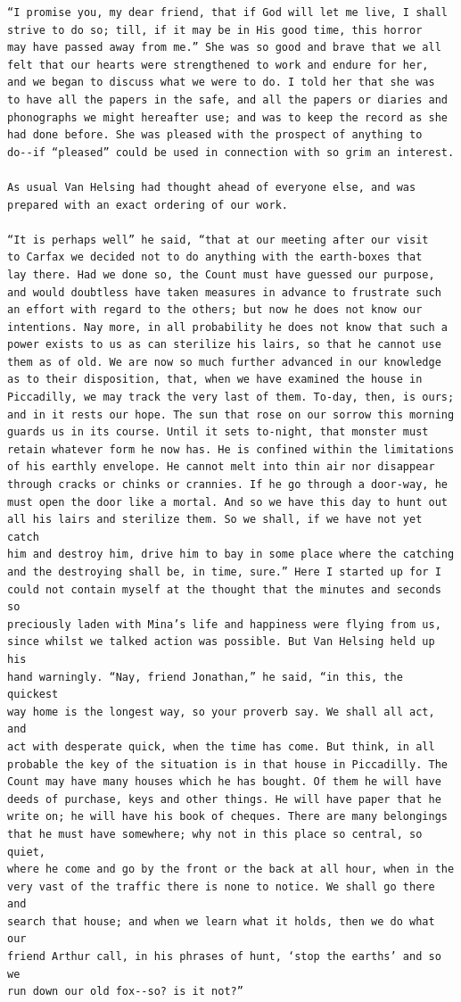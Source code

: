 \documentclass{article}
\begin{document}
\begin{verbatim}
“I promise you, my dear friend, that if God will let me live, I shall
strive to do so; till, if it may be in His good time, this horror
may have passed away from me.” She was so good and brave that we all
felt that our hearts were strengthened to work and endure for her,
and we began to discuss what we were to do. I told her that she was
to have all the papers in the safe, and all the papers or diaries and
phonographs we might hereafter use; and was to keep the record as she
had done before. She was pleased with the prospect of anything to
do--if “pleased” could be used in connection with so grim an interest.

As usual Van Helsing had thought ahead of everyone else, and was
prepared with an exact ordering of our work.

“It is perhaps well” he said, “that at our meeting after our visit
to Carfax we decided not to do anything with the earth-boxes that
lay there. Had we done so, the Count must have guessed our purpose,
and would doubtless have taken measures in advance to frustrate such
an effort with regard to the others; but now he does not know our
intentions. Nay more, in all probability he does not know that such a
power exists to us as can sterilize his lairs, so that he cannot use
them as of old. We are now so much further advanced in our knowledge
as to their disposition, that, when we have examined the house in
Piccadilly, we may track the very last of them. To-day, then, is ours;
and in it rests our hope. The sun that rose on our sorrow this morning
guards us in its course. Until it sets to-night, that monster must
retain whatever form he now has. He is confined within the limitations
of his earthly envelope. He cannot melt into thin air nor disappear
through cracks or chinks or crannies. If he go through a door-way, he
must open the door like a mortal. And so we have this day to hunt out
all his lairs and sterilize them. So we shall, if we have not yet catch
him and destroy him, drive him to bay in some place where the catching
and the destroying shall be, in time, sure.” Here I started up for I
could not contain myself at the thought that the minutes and seconds so
preciously laden with Mina’s life and happiness were flying from us,
since whilst we talked action was possible. But Van Helsing held up his
hand warningly. “Nay, friend Jonathan,” he said, “in this, the quickest
way home is the longest way, so your proverb say. We shall all act, and
act with desperate quick, when the time has come. But think, in all
probable the key of the situation is in that house in Piccadilly. The
Count may have many houses which he has bought. Of them he will have
deeds of purchase, keys and other things. He will have paper that he
write on; he will have his book of cheques. There are many belongings
that he must have somewhere; why not in this place so central, so quiet,
where he come and go by the front or the back at all hour, when in the
very vast of the traffic there is none to notice. We shall go there and
search that house; and when we learn what it holds, then we do what our
friend Arthur call, in his phrases of hunt, ‘stop the earths’ and so we
run down our old fox--so? is it not?”


\end{verbatim}
\end{document}
